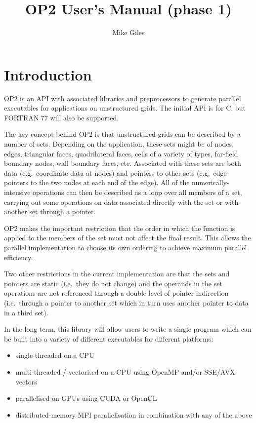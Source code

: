 \documentclass[11pt]{article}
\begin{document}
\title{OP2 User's Manual (phase 1)}
\author{Mike Giles}
\maketitle


\newpage
\section{Introduction}

OP2 is an API with associated libraries and preprocessors to 
generate parallel executables for applications on unstructured grids.  
The initial API is for C, but FORTRAN 77 will also be supported.

The key concept behind OP2 is that unstructured grids can be described
by a number of sets.  Depending on the application, these sets might
be of nodes, edges, triangular faces, quadrilateral faces, cells of
a variety of types, far-field boundary nodes, wall boundary faces, etc.
Associated with these sets are both data (e.g.~coordinate data at 
nodes) and pointers to other sets (e.g.~edge pointers to the two 
nodes at each end of the edge).  All of the numerically-intensive
operations can then be described as a loop over all members of a set, 
carrying out some operations on data associated directly
with the set or with another set through a pointer.   

OP2 makes the important restriction that the order in which the
function is applied to the members of the set must not affect the
final result.  This allows the parallel implementation to choose
its own ordering to achieve maximum parallel efficiency.

Two other restrictions in the current implementation are that 
the sets and pointers are static (i.e.~they do not change) and the 
operands in the set operations are not referenced through a double 
level of pointer indirection (i.e.~through a pointer to another set 
which in turn uses another pointer to data in a third set).

In the long-term, this library will allow users to write a single
program which can be built into a variety of different executables for
different platforms:
\begin{itemize}
\item
single-threaded on a CPU
\item
multi-threaded / vectorised on a CPU using OpenMP and/or SSE/AVX vectors
\item
parallelised on GPUs using CUDA or OpenCL
\item
distributed-memory MPI parallelisation in combination with any of the above
\end{itemize}
\end{document}
